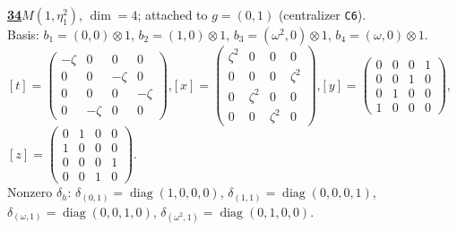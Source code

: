 \begin{samepage}\noindent\textbf{\underline{34}}\quad $M(1,\eta^{2}_{1})$, $\dim=4$; attached to $g=(0,1)$ (centralizer \texttt{C6}).\\
Basis: $b_{1}=(0,0)\otimes 1$, $b_{2}=(1,0)\otimes 1$, $b_{3}=(\omega^2,0)\otimes 1$, $b_{4}=(\omega,0)\otimes 1$.\\
$[t]=\left(\begin{smallmatrix} -\zeta & 0 & 0 & 0 \\ 0 & 0 & -\zeta & 0 \\ 0 & 0 & 0 & -\zeta \\ 0 & -\zeta & 0 & 0 \end{smallmatrix}\right)$,\quad $[x]=\left(\begin{smallmatrix} \zeta^2 & 0 & 0 & 0 \\ 0 & 0 & 0 & \zeta^2 \\ 0 & \zeta^2 & 0 & 0 \\ 0 & 0 & \zeta^2 & 0 \end{smallmatrix}\right)$,\quad $[y]=\left(\begin{smallmatrix} 0 & 0 & 0 & 1 \\ 0 & 0 & 1 & 0 \\ 0 & 1 & 0 & 0 \\ 1 & 0 & 0 & 0 \end{smallmatrix}\right)$,\quad $[z]=\left(\begin{smallmatrix} 0 & 1 & 0 & 0 \\ 1 & 0 & 0 & 0 \\ 0 & 0 & 0 & 1 \\ 0 & 0 & 1 & 0 \end{smallmatrix}\right)$.\\
Nonzero $\delta_h$: $\delta_{(0,1)}=\operatorname{diag}(1,0,0,0)$, $\delta_{(1,1)}=\operatorname{diag}(0,0,0,1)$, $\delta_{(\omega,1)}=\operatorname{diag}(0,0,1,0)$, $\delta_{(\omega^2,1)}=\operatorname{diag}(0,1,0,0)$.\end{samepage}
\medskip

